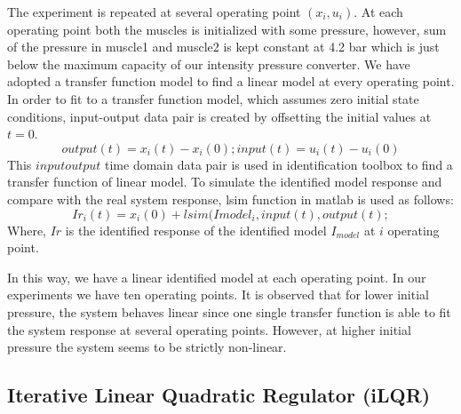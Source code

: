 \documentclass[conference]{IEEEtran}
\begin{document}
The experiment is repeated at several operating point $(x_{i}, u_{i})$. At each operating point both the muscles is initialized with some pressure, however, sum of the pressure in muscle1 and muscle2 is kept constant at 4.2 bar which is just below the maximum capacity of our intensity pressure converter. We have adopted a transfer function model to find a linear model at every operating point. In order to fit to a transfer function model, which assumes zero initial state conditions, input-output data pair is created by offsetting the initial values at $t=0$. 
 \begin{equation}
 output(t) = x_{i}(t) - x_{i}(0); 
 input(t) = u_{i}(t) - u_{i}(0)
\end{equation}
This $input output$ time domain data pair is used in identification toolbox to find a transfer function of linear model. To simulate the identified model response  and compare with the real system response, lsim function in matlab is used as follows:
\begin{equation}
Ir_{i}(t) = x_{i}(0) + lsim(Imodel_{i},input(t), output(t); 
\end{equation}
Where, $Ir$ is the identified response of the identified model $I_{model}$ at $i$ operating point.


In this way, we have a linear identified model at each operating point. In our experiments we have ten operating points. It is observed that for lower initial pressure, the system behaves linear since one single transfer function is able to fit the system response at several operating points. However, at higher initial pressure the system seems to be strictly non-linear. 

\subsection{Iterative Linear Quadratic Regulator (iLQR)}\label{subsec:ilqr}
\end{document}
